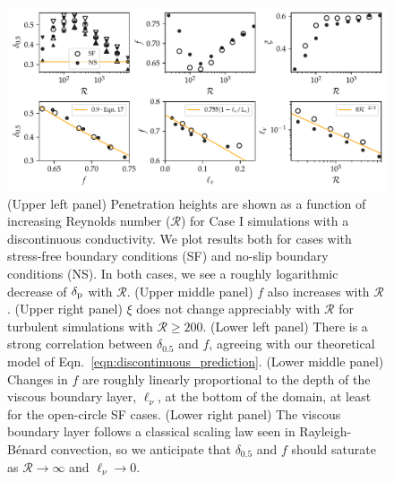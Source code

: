 \documentclass[twocolumn]{aastex631}
\newcommand{\delp}{\ensuremath{\delta_{\rm{p}}}}
\newcommand{\mR}{\ensuremath{\mathcal{R}}}
\begin{document}
\begin{figure}[t]
\centering
\includegraphics[width=\textwidth]{parameters_vs_re.pdf}
\caption{
(Upper left panel) Penetration heights are shown as a function of increasing Reynolds number ($\mR$) for Case I simulations with a discontinuous conductivity.
We plot results both for cases with stress-free boundary conditions (SF) and no-slip boundary conditions (NS).
In both cases, we see a roughly logarithmic decrease of $\delp$ with $\mR$.
(Upper middle panel) $f$ also increases with $\mR$.
(Upper right panel) $\xi$ does not change appreciably with $\mR$ for turbulent simulations with $\mR \geq 200$.
(Lower left panel) There is a strong correlation between $\delta_{0.5}$ and $f$, agreeing with our theoretical model of Eqn.~\ref{eqn:discontinuous_prediction}.
(Lower middle panel) Changes in $f$ are roughly linearly proportional to the depth of the viscous boundary layer, $\ell_\nu$, at the bottom of the domain, at least for the open-circle SF cases.
(Lower right panel) The viscous boundary layer follows a classical scaling law seen in Rayleigh-B\'{e}nard convection, so we anticipate that $\delta_{0.5}$ and $f$ should saturate as $\mR \rightarrow \infty$ and $\ell_{\nu} \rightarrow 0$.
\label{fig:parameters_vs_re}
}
\end{figure}
\end{document}
